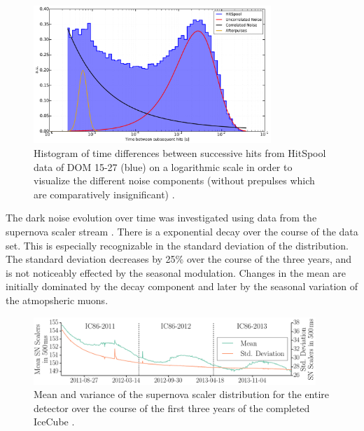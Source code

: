 \begin{figure}[!h]
 \centering
  \includegraphics[width=0.8\textwidth]{graphics/dom/performance/darknoise/SingleDOM_HitSpool_Hits_deltaT_fits_example.pdf}
 \caption{Histogram of time differences between successive hits from HitSpool data of
DOM 15-27 (blue) on a logarithmic scale in order to visualize the different noise components
(without prepulses which are comparatively insignificant) \cite{heereman2015hitspooling}.}
 \label{fig:darknoise_deltaT_components}
\end{figure}


The dark noise evolution over time was investigated using data from the supernova scaler stream \cite{briedel_phd}. There is a exponential decay over the course of the data set. This is especially recognizable in the standard deviation of the distribution. The standard deviation decreases by 25\% over the
course of the three years, and is not noticeably effected by the seasonal modulation. Changes in the mean are initially
dominated by the decay component and later by the seasonal variation of the atmopsheric muons. 


\begin{figure}[!h]
 \centering
 \includegraphics[width=0.95\textwidth]{graphics/dom/performance/darknoise/briedel1.png}
 \caption{Mean and variance of the supernova scaler distribution for the entire detector over the course of the first three
years of the completed IceCube \cite{briedel_phd}.}
 \label{fig:noise_over_time_briedel}
\end{figure}


